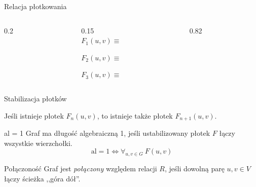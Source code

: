 \begin{frame}{Relacja płotkowania}

\begin{columns}[c,onlytextwidth]
  \begin{column}{0.2\textwidth}
      
  \end{column}
  \begin{column}{0.15\textwidth} 
  \vspace{-3.5em}\\
    $F_1(u,v) \equiv$

    \vspace{4em}

    $F_2(u,v) \equiv$

    \vspace{5em}

    $F_3(u,v) \equiv$
  \end{column}

  \begin{column}{0.82\textwidth}
    

    

    
  \end{column}
\end{columns}

\end{frame}



\begin{frame}{Stabilizacja płotków}
    \begin{figure}
        \centering
    \end{figure}
    Jeśli istnieje płotek \(F_n(u,v)\), to istnieje także płotek \(F_{n+1}(u,v)\).
    \\
    \vspace{1em}
\end{frame}


\begin{frame}{al = 1}
    Graf ma długość algebraiczną 1, jeśli ustabilizowany płotek \(F\) łączy wszystkie wierzchołki.
    \[\mathrm{al}=1 \Longleftrightarrow \forall_{u,v\in G} \ F(u,v)\]
\end{frame}


\begin{frame}{Połączoność}
    Graf jest \emph{połączony} względem relacji \(R\), jeśli dowolną parę \(u, v \in V\) łączy ścieżka ,,góra dół''.
    \begin{figure}
        \centering
        
    \end{figure}
\end{frame}
